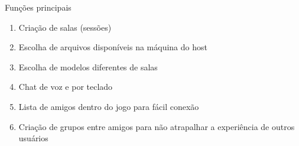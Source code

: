 \documentclass[12pt]{beamer}
\begin{document}
\begin{frame}{Funções principais}
    \begin{enumerate}[label=•]
        \item Criação de salas (sessões)
        \item Escolha de arquivos disponíveis na máquina do host
        \item Escolha de modelos diferentes de salas
        \item Chat de voz e por teclado
        \item Lista de amigos dentro do jogo para fácil conexão
        \item Criação de grupos entre amigos para não atrapalhar a experiência de outros usuários
    \end{enumerate}
\end{frame}
\end{document}
